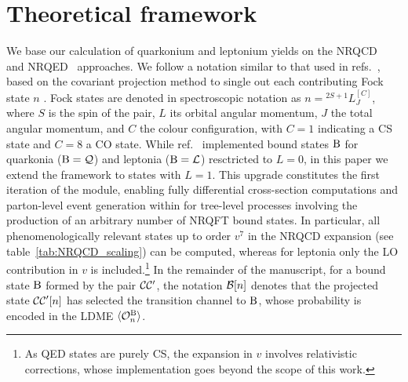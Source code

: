 \section{Theoretical framework}\label{sec:nrqft}

We base our calculation of quarkonium and leptonium yields on the NRQCD~\cite{Bodwin:1994jh} and NRQED~\cite{Caswell:1985ui} approaches. 
We follow a notation similar to that used in refs.~\cite{AH:2024ueu, ColpaniSerri:2025vdz}, based on the covariant projection method to single out each contributing Fock state $n$ \cite{Kuhn:1979bb,Guberina:1980dc,Berger:1980ni,Petrelli:1997ge,Maltoni:1997pt}. Fock states are denoted in spectroscopic notation as $n = {}^{2 S + 1} L_J^{[C]}$, where $S$ is the spin of the pair, $L$ its orbital angular momentum, $J$ the total angular momentum, and $C$ the colour configuration, with $C = 1$ indicating a CS state and $C = 8$ a CO state. While ref.~\cite{ColpaniSerri:2025vdz} implemented bound states $\rm B$ for quarkonia (${\rm B} = {\cal Q}$) and leptonia (${\rm B} = {\cal L}$) resctricted to $L=0$, in this paper we extend the framework to states with $L=1$. This upgrade constitutes the first iteration of the {\madsons} module, enabling fully differential cross-section computations and parton-level event generation within {\mgshort} for tree-level processes involving the production of an arbitrary number of NRQFT bound states. 
In particular, all phenomenologically relevant states up to order $v^7$ in the NRQCD expansion (see table~\ref{tab:NRQCD_scaling}) can be computed, whereas for leptonia only the LO contribution in $v$ is included.\footnote{As QED states are purely CS, the expansion in $v$ involves relativistic corrections, whose implementation goes beyond the scope of this work.}
In the remainder of the manuscript, for a bound state $\rm B$ formed by the pair ${\cal C} {\cal C}^\prime$, the notation ${\cal B}[n]$ denotes that the projected state ${\cal C C}^\prime [n]$ has selected the transition channel to $\rm B$, whose probability is encoded in the LDME $\langle {\cal O}_n^{\rm B} \rangle$. 

